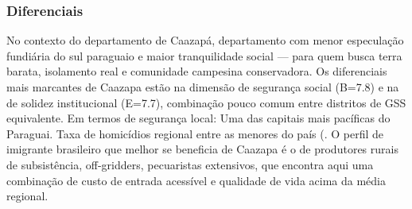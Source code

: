 \subsubsection*{Diferenciais}\label{dif-caazapa-0601}
No contexto do departamento de Caazapá, departamento com menor especulação fundiária do sul paraguaio e maior tranquilidade social — para quem busca terra barata, isolamento real e comunidade campesina conservadora. Os diferenciais mais marcantes de Caazapa estão na dimensão de segurança social (B=7.8) e na de solidez institucional (E=7.7), combinação pouco comum entre distritos de GSS equivalente. Em termos de segurança local: Uma das capitais mais pacíficas do Paraguai. Taxa de homicídios regional entre as menores do país (. O perfil de imigrante brasileiro que melhor se beneficia de Caazapa é o de produtores rurais de subsistência, off-gridders, pecuaristas extensivos, que encontra aqui uma combinação de custo de entrada acessível e qualidade de vida acima da média regional.
